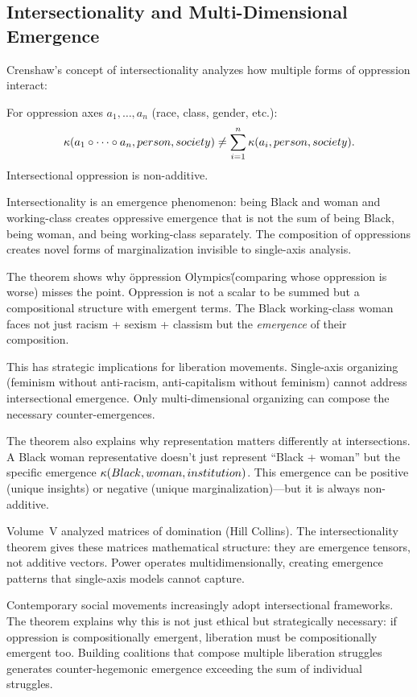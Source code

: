 \subsection{Intersectionality and Multi-Dimensional Emergence}

Crenshaw's concept of intersectionality analyzes how multiple forms of oppression
interact:

\begin{theorem}
\label{thm:intersectionality}
For oppression axes $a_1, \ldots, a_n$ (race, class, gender, etc.):
\[
  \kappa(a_1 \circ \cdots \circ a_n, person, society) \neq
  \sum_{i=1}^n \kappa(a_i, person, society).
\]
Intersectional oppression is non-additive.
\end{theorem}

\begin{interpretation}
Intersectionality is an emergence phenomenon: being Black and woman and working-class
creates oppressive emergence that is not the sum of being Black, being woman,
and being working-class separately. The composition of oppressions creates novel
forms of marginalization invisible to single-axis analysis.

The theorem shows why \"oppression Olympics\" (comparing whose oppression is
worse) misses the point. Oppression is not a scalar to be summed but a
compositional structure with emergent terms. The Black working-class woman faces
not just racism + sexism + classism but the \emph{emergence} of their composition.

This has strategic implications for liberation movements. Single-axis organizing
(feminism without anti-racism, anti-capitalism without feminism) cannot address
intersectional emergence. Only multi-dimensional organizing can compose the
necessary counter-emergences.

The theorem also explains why representation matters differently at intersections.
A Black woman representative doesn't just represent ``Black + woman'' but the
specific emergence $\kappa(Black, woman, institution)$. This emergence can be
positive (unique insights) or negative (unique marginalization)---but it is
always non-additive.

Volume~V analyzed matrices of domination (Hill Collins). The intersectionality
theorem gives these matrices mathematical structure: they are emergence tensors,
not additive vectors. Power operates multidimensionally, creating emergence
patterns that single-axis models cannot capture.

Contemporary social movements increasingly adopt intersectional frameworks. The
theorem explains why this is not just ethical but strategically necessary: if
oppression is compositionally emergent, liberation must be compositionally emergent
too. Building coalitions that compose multiple liberation struggles generates
counter-hegemonic emergence exceeding the sum of individual struggles.
\end{interpretation}


